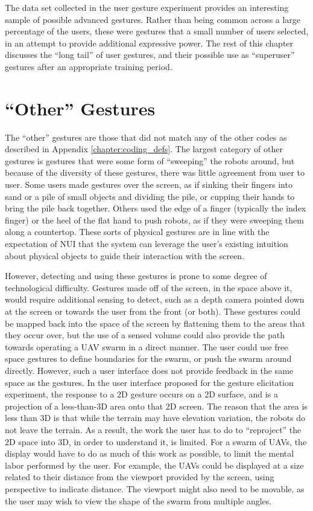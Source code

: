 The data set collected in the user gesture experiment provides an interesting sample of possible advanced gestures. 
Rather than being common across a large percentage of the users, these were gestures that a small number of users selected, in an attempt to provide additional expressive power. 
The rest of this chapter discusses the ``long tail'' of user gestures, and their possible use as ``superuser'' gestures after an appropriate training period. 

\section{``Other'' Gestures}

The ``other'' gestures are those that did not match any of the other codes as described in Appendix \ref{chapter:coding_defs}. 
The largest category of other gestures is gestures that were some form of ``sweeping'' the robots around, but because of the diversity of these gestures, there was little agreement from user to user. 
Some users made gestures over the screen, as if sinking their fingers into sand or a pile of small objects and dividing the pile, or cupping their hands to bring the pile back together. 
Others used the edge of a finger (typically the index finger) or the heel of the flat hand to push robots, as if they were sweeping them along a countertop. 
These sorts of physical gestures are in line with the expectation of NUI that the system can leverage the user's existing intuition about physical objects to guide their interaction with the screen. 

However, detecting and using these gestures is prone to some degree of technological difficulty. 
Gestures made off of the screen, in the space above it, would require additional sensing to detect, such as a depth camera pointed down at the screen or towards the user from the front (or both). 
These gestures could be mapped back into the space of the screen by flattening them to the areas that they occur over, but the use of a sensed volume could also provide the path towards operating a UAV swarm in a direct manner. 
The user could use free space gestures to define boundaries for the swarm, or push the swarm around directly. 
However, such a user interface does not provide feedback in the same space as the gestures. 
In the user interface proposed for the gesture elicitation experiment, the response to a 2D gesture occurs on a 2D surface, and is a projection of a less-than-3D area onto that 2D screen.
The reason that the area is less than 3D is that while the terrain may have elevation variation, the robots do not leave the terrain. 
As a result, the work the user has to do to ``reproject'' the 2D space into 3D, in order to understand it, is limited. 
For a swarm of UAVs, the display would have to do as much of this work as possible, to limit the mental labor performed by the user. 
For example, the UAVs could be displayed at a size related to their distance from the viewport provided by the screen, using perspective to indicate distance. 
The viewport might also need to be movable, as the user may wish to view the shape of the swarm from multiple angles. 


